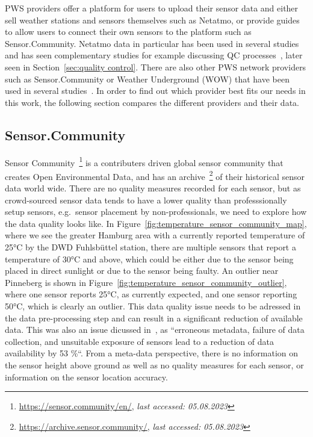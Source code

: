 PWS providers offer a platform for users to upload their sensor data and either sell weather stations and sensors themselves such as Netatmo, or provide guides to allow users to connect their own sensors to the platform such as Sensor.Community. Netatmo data in particular has been used in several studies~\cite{meier2017crowdsourcing, hahn2022observations, venter2020hyperlocal, zumwald2021mapping} and has seen complementary studies for example discussing QC processes~\cite{fenner2021crowdqc+}, later seen in Section~\ref{sec:quality control}. There are also other PWS network providers such as Sensor.Community or Weather Underground (WOW) that have been used in several studies~\cite{ho2014mapping}. In order to find out which provider best fits our needs in this work, the following section compares the different providers and their data.

\subsection{Sensor.Community}

Sensor Community~\footnote{\url{https://sensor.community/en/}, \textit{last accessed: 05.08.2023}} is a contributers driven global sensor community that creates Open Environmental Data, and has an archive~\footnote{\url{https://archive.sensor.community/}, \textit{last accessed: 05.08.2023}} of their historical sensor data world wide. There are no quality measures recorded for each sensor, but as crowd-sourced sensor data tends to have a lower quality than professsionally setup sensors, e.g.\ sensor placement by non-professionals, we need to explore how the data quality looks like.
In Figure~\ref{fig:temperature_sensor_community_map}, where we see the greater Hamburg area with a currently reported temperature of 25°C by the DWD Fuhlsbüttel station, there are multiple sensors that report a temperature of 30°C and above, which could be either due to the sensor being placed in direct sunlight or due to the sensor being faulty. An outlier near Pinneberg is shown in Figure~\ref{fig:temperature_sensor_community_outlier}, where one sensor reports 25°C, as currently expected, and one sensor reporting 50°C, which is clearly an outlier. This data quality issue needs to be adressed in the data pre-processing step and can result in a significant reduction of available data. This was also an issue dicussed in~\cite{meier2017crowdsourcing}, as ``erroneous metadata, failure of data collection, and unsuitable exposure of sensors lead to a reduction of data availability by 53 \%``.
From a meta-data perspective, there is no information on the sensor height above ground as well as no quality measures for each sensor, or information on the sensor location accuracy.

